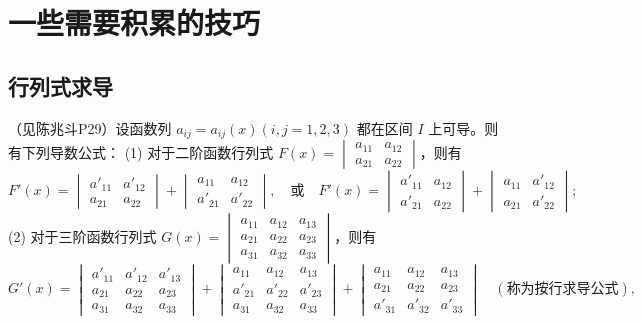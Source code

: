 \chapter{一些需要积累的技巧}

\section{行列式求导}
（见陈兆斗P29）设函数列 \(a_{ij}=a_{ij}(x)(i,j=1,2,3)\) 都在区间 \(I\) 上可导。则有下列导数公式：
(1) 对于二阶函数行列式 \(F(x)=\begin{vmatrix}a_{11}&a_{12}\\a_{21}&a_{22}\end{vmatrix}\)，则有
\[
F'(x)=\begin{vmatrix}a'_{11}&a'_{12}\\a_{21}&a_{22}\end{vmatrix}+\begin{vmatrix}a_{11}&a_{12}\\a'_{21}&a'_{22}\end{vmatrix}, \quad \text{或} \quad F'(x)=\begin{vmatrix}a'_{11}&a_{12}\\a'_{21}&a_{22}\end{vmatrix}+\begin{vmatrix}a_{11}&a'_{12}\\a_{21}&a'_{22}\end{vmatrix};
\]
(2) 对于三阶函数行列式 \(G(x)=\begin{vmatrix}a_{11}&a_{12}&a_{13}\\a_{21}&a_{22}&a_{23}\\a_{31}&a_{32}&a_{33}\end{vmatrix}\)，则有
\[
G'(x)=\begin{vmatrix}a'_{11}&a'_{12}&a'_{13}\\a_{21}&a_{22}&a_{23}\\a_{31}&a_{32}&a_{33}\end{vmatrix}+\begin{vmatrix}a_{11}&a_{12}&a_{13}\\a'_{21}&a'_{22}&a'_{23}\\a_{31}&a_{32}&a_{33}\end{vmatrix}+\begin{vmatrix}a_{11}&a_{12}&a_{13}\\a_{21}&a_{22}&a_{23}\\a'_{31}&a'_{32}&a'_{33}\end{vmatrix} \quad (\text{称为按行求导公式}),
\]
